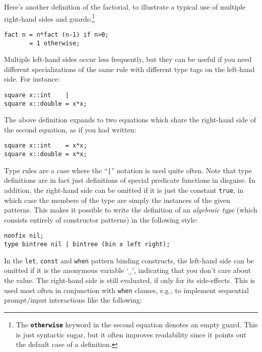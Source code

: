 \documentclass[a4paper,12pt]{article}
\newcommand{\kw}[1]{\texttt{\textbf{#1}}}
\begin{document}
Here's another definition of the factorial, to illustrate a typical use of multiple right-hand sides and guards:\footnote{The \kw{otherwise} keyword in the second equation denotes an empty guard. This is just syntactic sugar, but it often improves readability since it points out the default case of a definition.}

\begin{lstlisting}
fact n = n*fact (n-1) if n>0;
       = 1 otherwise;
\end{lstlisting}

Multiple left-hand sides occur less frequently, but they can be useful if you need different specializations of the same rule with different type tags on the left-hand side. For instance:

\begin{lstlisting}
square x::int    |
square x::double = x*x;
\end{lstlisting}

The above definition expands to two equations which share the right-hand side of the second equation, as if you had written:

\begin{lstlisting}
square x::int    = x*x;
square x::double = x*x;
\end{lstlisting}

Type rules are a case where the ``\verb:|:'' notation is used quite often. Note that type definitions are in fact just definitions of special predicate functions in disguise. In addition, the right-hand side can be omitted if it is just the constant \verb|true|, in which case the members of the type are simply the instances of the given patterns. This makes it possible to write the definition of an \emph{algebraic type} (which consists entirely of constructor patterns) in the following style:

\begin{lstlisting}
nonfix nil;
type bintree nil | bintree (bin x left right);
\end{lstlisting}

In the \lstinline{let}, \lstinline{const} and \lstinline{when} pattern binding constructs, the left-hand side can be omitted if it is the anonymous variable `\verb|_|', indicating that you don't care about the value. The right-hand side is still evaluated, if only for its side-effects. This is used most often in conjunction with \lstinline{when} clauses, e.g., to implement sequential prompt/input interactions like the following:
\end{document}

